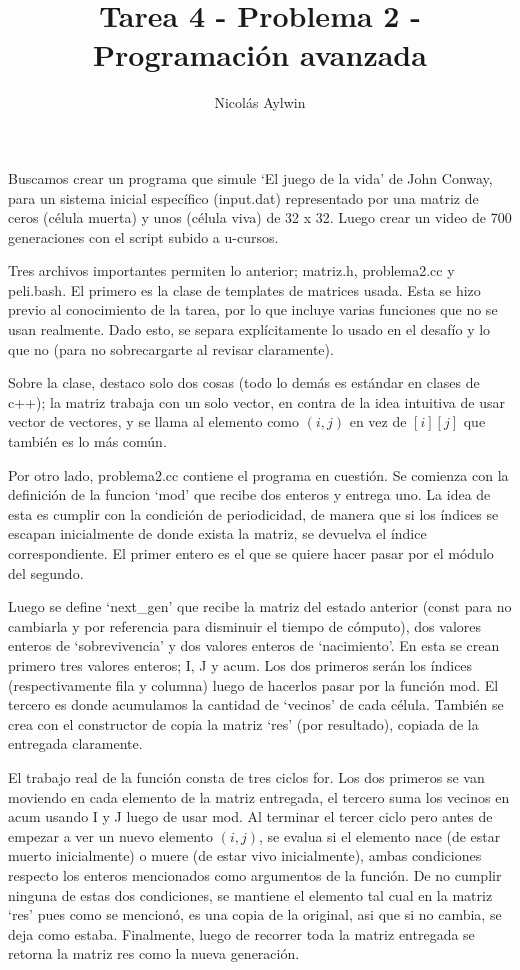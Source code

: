 \documentclass[12pt]{article}
\title{Tarea 4 - Problema 2 - Programación avanzada}
\author{Nicolás Aylwin}
\date{}
\begin{document}
\maketitle
Buscamos crear un programa que simule `El juego de la vida' de John Conway, para un sistema inicial específico (input.dat) representado por una matriz de ceros (célula muerta) y unos (célula viva) de 32 x 32. Luego crear un video de 700 generaciones con el script subido a u-cursos.

Tres archivos importantes permiten lo anterior; matriz.h, problema2.cc y peli.bash. El primero es la clase de templates de matrices usada. Esta se hizo previo al conocimiento de la tarea, por lo que incluye varias funciones que no se usan realmente. Dado esto, se separa explícitamente lo usado en el desafío y lo que no (para no sobrecargarte al revisar claramente).

Sobre la clase, destaco solo dos cosas (todo lo demás es estándar en clases de c++); la matriz trabaja con un solo vector, en contra de la idea intuitiva de usar vector de vectores, y se llama al elemento como $(i,j)$ en vez de $[i][j]$ que también es lo más común.

Por otro lado, problema2.cc contiene el programa en cuestión. Se comienza con la definición de la funcion `mod' que recibe dos enteros y entrega uno. La idea de esta es cumplir con la condición de periodicidad, de manera que si los índices se escapan inicialmente de donde exista la matriz, se devuelva el índice correspondiente. El primer entero es el que se quiere hacer pasar por el módulo del segundo.

Luego se define `next\_gen' que recibe la matriz del estado anterior (const para no cambiarla y por referencia para disminuir el tiempo de cómputo), dos valores enteros de `sobrevivencia' y dos valores enteros de `nacimiento'. En esta se crean primero tres valores enteros; I, J y acum. Los dos primeros serán los índices (respectivamente fila y columna) luego de hacerlos pasar por la función mod. El tercero es donde acumulamos la cantidad de `vecinos' de cada célula. También se crea con el constructor de copia la matriz `res' (por resultado), copiada de la entregada claramente. 

El trabajo real de la función consta de tres ciclos for. Los dos primeros se van moviendo en cada elemento de la matriz entregada, el tercero suma los vecinos en acum usando I y J luego de usar mod. Al terminar el tercer ciclo pero antes de empezar a ver un nuevo elemento $(i,j)$, se evalua si el elemento nace (de estar muerto inicialmente) o muere (de estar vivo inicialmente), ambas condiciones respecto los enteros mencionados como argumentos de la función. De no cumplir ninguna de estas dos condiciones, se mantiene el elemento tal cual en la matriz `res' pues como se mencionó, es una copia de la original, asi que si no cambia, se deja como estaba. Finalmente, luego de recorrer toda la matriz entregada se retorna la matriz res como la nueva generación.
\end{document}
